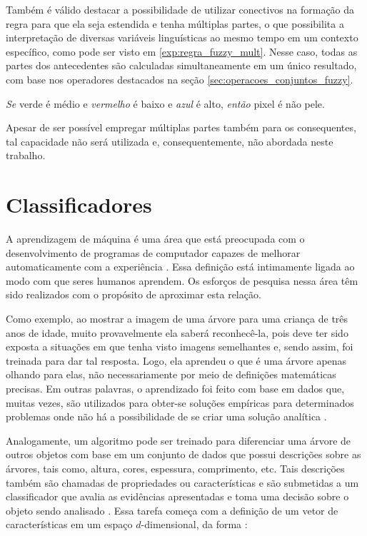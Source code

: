 Também é válido destacar a possibilidade de utilizar conectivos na formação da regra para que ela seja estendida e tenha múltiplas partes, o que possibilita a interpretação de diversas variáveis linguísticas ao mesmo tempo em um contexto específico, como pode ser visto em \ref{exp:regra_fuzzy_mult}. Nesse caso, todas as partes dos antecedentes são calculadas simultaneamente em um único resultado, com base nos operadores destacados na seção \ref{sec:operacoes_conjuntos_fuzzy}.

\begin{exmp}
\label{exp:regra_fuzzy_mult}
\emph{Se} verde é médio e \emph{vermelho} é baixo e \emph{azul} é alto, \emph{então} pixel é não pele.
\end{exmp}

Apesar de ser possível empregar múltiplas partes também para os consequentes, tal capacidade não será utilizada e, consequentemente, não abordada neste trabalho.


\section{Classificadores}
\label{sec:classificadores}
A aprendizagem de máquina é uma área que está preocupada com o desenvolvimento de programas de computador capazes de melhorar automaticamente com a experiência \citep{mitchell:97}. Essa definição está intimamente ligada ao modo com que seres humanos aprendem. Os esforços de pesquisa nessa área têm sido realizados com o propósito de aproximar esta relação.

Como exemplo, ao mostrar a imagem de uma árvore para uma criança de três anos de idade, muito provavelmente ela saberá reconhecê-la, pois deve ter sido exposta a situações em que tenha visto imagens semelhantes e, sendo assim, foi treinada para dar tal resposta. Logo, ela aprendeu o que é uma árvore apenas olhando para elas, não necessariamente por meio de definições matemáticas precisas. Em outras palavras, o aprendizado foi feito com base em dados que, muitas vezes, são utilizados para obter-se soluções empíricas para determinados problemas onde não há a possibilidade de se criar uma solução analítica \citep{mostafa:12}.

Analogamente, um algoritmo pode ser treinado para diferenciar uma árvore de outros objetos com base em um conjunto de dados que possui descrições sobre as árvores, tais como, altura, cores, espessura, comprimento, etc. Tais descrições também são chamadas de propriedades ou características e são submetidas a um classificador que avalia as evidências apresentadas e toma uma decisão sobre o objeto sendo analisado \citep{duda:12}. Essa tarefa começa com a definição de um vetor de características em um espaço $d$-dimensional, da forma \citep{duda:12}:

